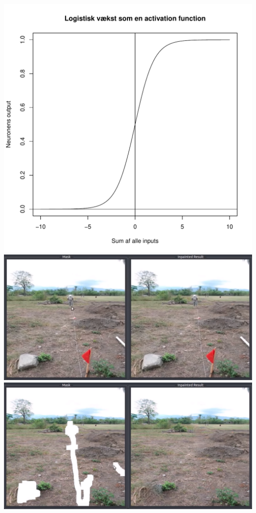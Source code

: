 \documentclass[12pt]{article}
\begin{document}


\includegraphics[width=\textwidth]{diagrammer/sigmoid.pdf}
\includegraphics[width=\textwidth]{pic/CNN1.png}
\includegraphics[width=\textwidth]{pic/CNN2.png}
\end{document}
